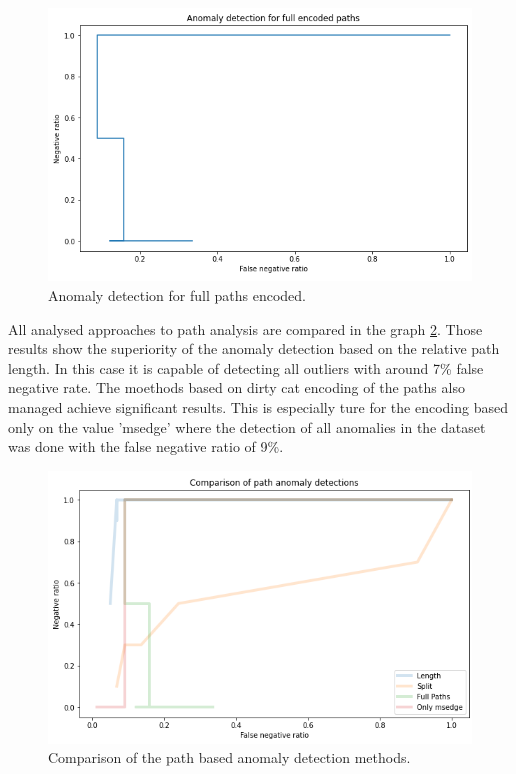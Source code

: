 \documentclass[a4paper,twoside,12pt]{book}
\begin{document}
\begin{figure}
	\centering
	\includegraphics[scale=0.9]{images/EncFullPathErrorKF}
	\caption{Anomaly detection for full paths encoded.}
	\label{fig:encfullpath}
 \end{figure}

All analysed approaches to path analysis are compared in the graph \ref{fig:pathcomp}. Those results show the
superiority of the anomaly detection based on the relative path length. In this case it is capable of detecting 
all outliers with around 7\% false negative rate. The moethods based on dirty cat encoding of the paths also managed 
achieve significant results. This is especially ture for the encoding based only on the value 'msedge' where 
the detection of all anomalies in the dataset was done with the false negative ratio of 9\%. 

\begin{figure}
	\centering
	\includegraphics[scale=0.9]{images/PathCompGraph2}
	\caption{Comparison of the path based anomaly detection methods.}
	\label{fig:pathcomp}
 \end{figure}
\end{document}
